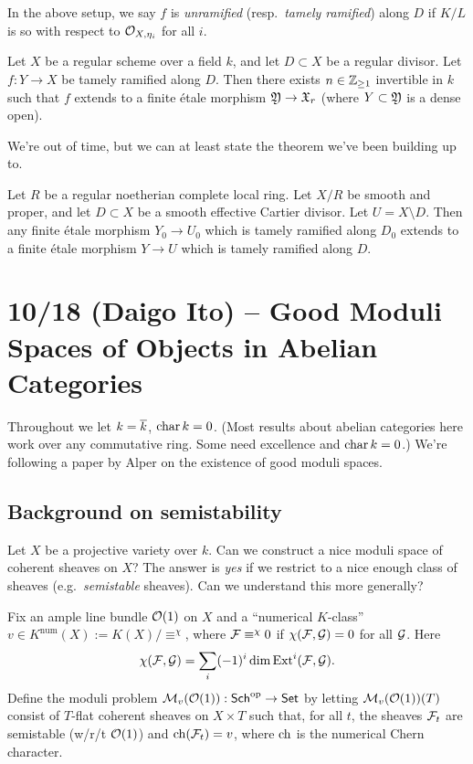 \documentclass{amsart}
\begin{document}
\begin{dfn}
	In the above setup, we say $f$ is \emph{unramified} (resp.\ \emph{tamely ramified}) along $D$ if $K / L$ is so with respect to $\mathcal{O}_{X,\eta_i}$ for all $i$.
\end{dfn}

\begin{prop}
	Let $X$ be a regular scheme over a field $k$, and let $D \subset X$ be a regular divisor.
	Let $f: Y \to X$ be tamely ramified along $D$.
	Then there exists $n \in \mathbb{Z}_{\geq 1}$ invertible in $k$ such that $f$ extends to a finite \'etale morphism $\mathfrak{Y} \to \mathfrak{X}_r$ (where $Y \subset \mathfrak{Y}$ is a dense open).
\end{prop}

We're out of time, but we can at least state the theorem we've been building up to.

\begin{thm}
	Let $R$ be a regular noetherian complete local ring.
	Let $X / R$ be smooth and proper, and let $D \subset X$ be a smooth effective Cartier divisor.
	Let $U = X \setminus D$.
	Then any finite \'etale morphism $Y_0 \to U_0$ which is tamely ramified along $D_0$ extends to a finite \'etale morphism $Y \to U$ which is tamely ramified along $D$.
\end{thm}

\section{10/18 (Daigo Ito) -- Good Moduli Spaces of Objects in Abelian Categories}

Throughout we let $k = \overline{k}$, $\operatorname{char} k = 0$.
(Most results about abelian categories here work over any commutative ring.
Some need excellence and $\operatorname{char} k = 0$.)
We're following a paper by Alper on the existence of good moduli spaces.

\subsection{Background on semistability}

Let $X$ be a projective variety over $k$.
Can we construct a nice moduli space of coherent sheaves on $X$?
The answer is \emph{yes} if we restrict to a nice enough class of sheaves (e.g.\ \emph{semistable} sheaves).
Can we understand this more generally?

\begin{dfn}
	Fix an ample line bundle $\mathcal{O}(1)$ on $X$ and a ``numerical $K$-class'' $v \in K^{\mathrm{num}}(X) := K(X) / \equiv^\chi$, where $\mathcal{F} \equiv^\chi 0$ if $\chi(\mathcal{F}, \mathcal{G}) = 0$ for all $\mathcal{G}$.
	Here
	\[
		\chi(\mathcal{F}, \mathcal{G}) = \sum_i (-1)^i \dim \operatorname{Ext}^i(\mathcal{F}, \mathcal{G}).
	\]
	Define the moduli problem $\mathcal{M}_v(\mathcal{O}(1)): \mathsf{Sch}^{\mathrm{op}} \to \mathsf{Set}$ by letting $\mathcal{M}_v(\mathcal{O}(1))(T)$ consist of $T$-flat coherent sheaves on $X \times T$ such that, for all $t$, the sheaves $\mathcal{F}_t$ are semistable (w/r/t $\mathcal{O}(1)$) and $\mathrm{ch}(\mathcal{F}_t) = v$, where $\mathrm{ch}$ is the numerical Chern character.
\end{dfn}
\end{document}
